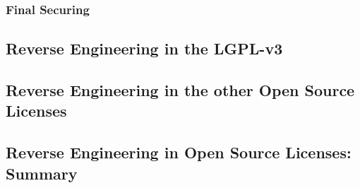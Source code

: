 \documentclass[DIV=calc,BCOR=5mm,12pt,headings=small,oneside,toc=bib]{scrbook}
\begin{document}
\subsubsection{Final Securing}

\subsection{Reverse Engineering in the LGPL-v3}

\subsection{Reverse Engineering in the other Open Source Licenses}

\subsection{Reverse Engineering in Open Source Licenses: Summary}
















{}
{}
{}
{}
{}
{}
{}
{}
{}
{}
{}
{}
{}
\end{document}
